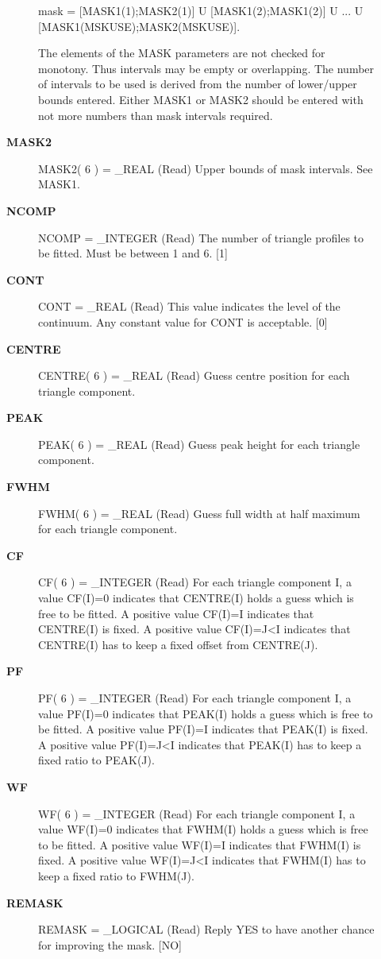 \begin{description}
\begin{description}
      mask = [MASK1(1);MASK2(1)] U [MASK1(2);MASK1(2)]
           U ...
           U [MASK1(MSKUSE);MASK2(MSKUSE)].

   The elements of the MASK parameters are not checked for
   monotony. Thus intervals may be empty or overlapping. The
   number of intervals to be used is derived from the number of
   lower/upper bounds entered. Either MASK1 or MASK2 should be
   entered with not more numbers than mask intervals required.
\item [{\bf MASK2}]
MASK2( 6 ) = _REAL (Read)
   Upper bounds of mask intervals. See MASK1.
\item [{\bf NCOMP}]
NCOMP = _INTEGER (Read)
   The number of triangle profiles to be fitted. Must be between 1
   and 6. [1]
\item [{\bf CONT}]
CONT = _REAL (Read)
   This value indicates the level of the continuum. Any constant
   value for CONT is acceptable. [0]
\item [{\bf CENTRE}]
CENTRE( 6 ) = _REAL (Read)
   Guess centre position for each triangle component.
\item [{\bf PEAK}]
PEAK( 6 ) = _REAL (Read)
   Guess peak height for each triangle component.
\item [{\bf FWHM}]
FWHM( 6 ) = _REAL (Read)
   Guess full width at half maximum for each triangle component.
\item [{\bf CF}]
CF( 6 ) = _INTEGER (Read)
   For each triangle component I, a value CF(I)=0 indicates that
   CENTRE(I) holds a guess which is free to be fitted.
   A positive value CF(I)=I indicates that CENTRE(I) is fixed.
   A positive value CF(I)=J<I indicates that CENTRE(I) has to
   keep a fixed offset from CENTRE(J).
\item [{\bf PF}]
PF( 6 ) = _INTEGER (Read)
   For each triangle component I, a value PF(I)=0 indicates that
   PEAK(I) holds a guess which is free to be fitted.
   A positive value PF(I)=I indicates that PEAK(I) is fixed.
   A positive value PF(I)=J<I indicates that PEAK(I) has to
   keep a fixed ratio to PEAK(J).
\item [{\bf WF}]
WF( 6 ) = _INTEGER (Read)
   For each triangle component I, a value WF(I)=0 indicates that
   FWHM(I) holds a guess which is free to be fitted.
   A positive value WF(I)=I indicates that FWHM(I) is fixed.
   A positive value WF(I)=J<I indicates that FWHM(I) has to
   keep a fixed ratio to FWHM(J).
\item [{\bf REMASK}]
REMASK = _LOGICAL (Read)
   Reply YES to have another chance for improving the mask.
   [NO]

\end{description}
\end{description}
